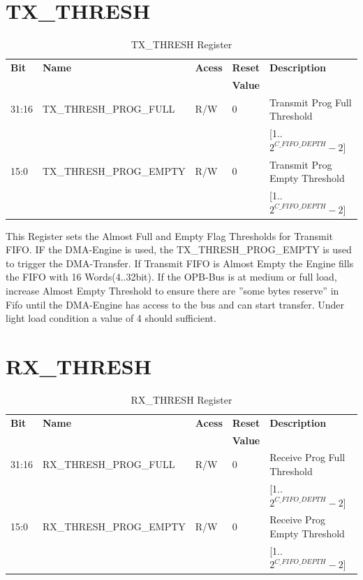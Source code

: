 \section{TX\_THRESH}
\begin{table}[!h]
	\centering
		\begin{tabularx} {160mm}{|p{1cm}|p{5cm}|p{1.5cm}|p{1cm}|X|} \hline
		\textbf{Bit}		& \textbf{Name}	& \textbf{Acess} & \textbf{Reset}				& \textbf{Description} 				\\ 
										&								&								 & \textbf{Value}				&															\\ \hline		
	  31:16						& TX\_THRESH\_PROG\_FULL 	& R/W	 & 0										& Transmit Prog Full Threshold\\
	  								&								&								 &											& [1..$2^{C\_FIFO\_DEPTH}-2$]	\\ \hline
	  15:0						& TX\_THRESH\_PROG\_EMPTY	& R/W	 & 0										& Transmit Prog Empty	Threshold\\
	  								&								&								 &											& [1..$2^{C\_FIFO\_DEPTH}-2$]	\\ \hline
	\end{tabularx}
	\caption{TX\_THRESH Register}
	\label{tab:TX_THRESH}
\end{table}

This Register sets the Almost Full and Empty Flag Thresholds for Transmit FIFO. IF the DMA-Engine is used, the TX\_THRESH\_PROG\_EMPTY is used to trigger the DMA-Transfer. If Transmit FIFO is Almost Empty the Engine fills the FIFO with 16 Words(4..32bit). If the OPB-Bus is at medium or full load, increase Almost Empty Threshold to ensure there are ''some bytes reserve'' in Fifo until the DMA-Engine has access to the bus and can start transfer. Under light load condition a value of 4 should sufficient. 


\section{RX\_THRESH}
\begin{table}[!h]
	\centering
		\begin{tabularx} {160mm}{|p{1cm}|p{5cm}|p{1.5cm}|p{1cm}|X|} \hline
		\textbf{Bit}		& \textbf{Name}	& \textbf{Acess} & \textbf{Reset}				& \textbf{Description} 				\\
										&								&								 & \textbf{Value}				&															\\ \hline
	  31:16						& RX\_THRESH\_PROG\_FULL 	& R/W	 & 0										& Receive Prog Full Threshold	\\
	  								&								&								 &											& [1..$2^{C\_FIFO\_DEPTH}-2$] \\ \hline
	  15:0						& RX\_THRESH\_PROG\_EMPTY	& R/W	 & 0										& Receive Prog Empty Threshold\\
	  								&								&								 &											& [1..$2^{C\_FIFO\_DEPTH}-2$] \\ \hline					\end{tabularx}
	\caption{RX\_THRESH Register}
	\label{tab:RX_THRESH}
\end{table}

